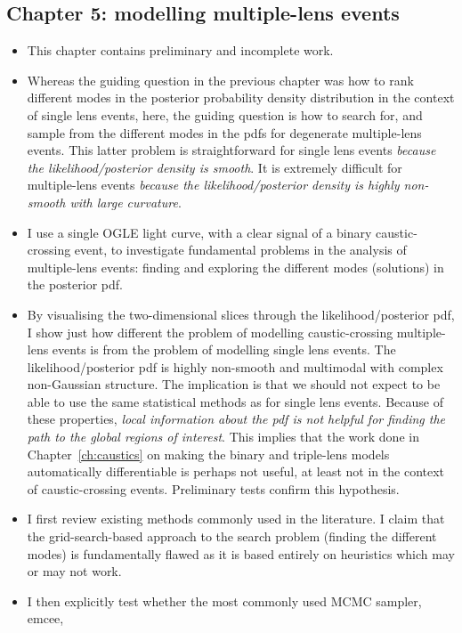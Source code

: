 \documentclass[12pt,dvipsnames]{report}
\newcommand{\ssf}[1]{\textsf{#1}}
\begin{document}
\subsection{Chapter 5: modelling multiple-lens events}
\begin{itemize}
\item This chapter contains preliminary and incomplete work. 
\item Whereas the guiding question in the previous chapter was how to rank different modes 
in the posterior probability density distribution in the context of single lens events,
here, the guiding question is how to search for, and sample from the different modes 
in the pdfs for degenerate multiple-lens events. This latter problem is straightforward 
for single lens events \emph{because the likelihood/posterior density is smooth}. It is 
extremely difficult for multiple-lens events \emph{because the likelihood/posterior density
is highly non-smooth with large curvature}.
\item I use a single OGLE light curve, with a clear signal of a binary caustic-crossing 
event, to investigate fundamental 
problems in the analysis of multiple-lens events: finding and exploring the different modes 
(solutions) in the posterior pdf.
\item By visualising the two-dimensional slices through the likelihood/posterior pdf, I show 
just how different the problem of modelling caustic-crossing multiple-lens events is from 
the problem of modelling single lens events. The likelihood/posterior pdf is highly non-smooth
and multimodal with complex non-Gaussian structure. The implication is that we should not 
expect to be able to use the same statistical methods as for single lens events. Because 
of these properties, \emph{local information about the pdf is not helpful for finding the path
to the global regions of interest}. This implies that the work done in 
Chapter~\ref{ch:caustics} on making the binary and triple-lens models automatically 
differentiable is perhaps not useful, at least not in the context of caustic-crossing 
events. Preliminary tests confirm this hypothesis.
\item I first review existing methods commonly used in the literature. I claim that 
the grid-search-based approach to the search problem (finding the different modes) is 
fundamentally flawed as it is based entirely on heuristics which may or may not work. 
\item I then explicitly test whether the most commonly used MCMC sampler, \ssf{emcee},

\end{itemize}
\end{document}
